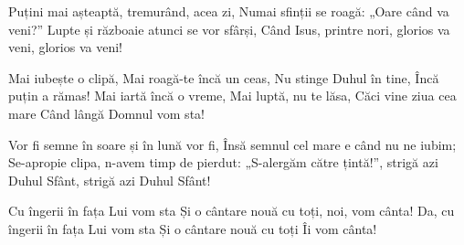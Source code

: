 \beginverse
Puțini mai așteaptă, tremurând, acea zi,
Numai sfinții se roagă: „Oare când va veni?”
Lupte și războaie atunci se vor sfârși,
Când Isus, printre nori, glorios va veni, glorios va veni!
\endverse

\beginchorus
Mai iubește o clipă,
Mai roagă-te încă un ceas,
Nu stinge Duhul în tine,
Încă puțin a rămas!
Mai iartă încă o vreme,
Mai luptă, nu te lăsa,
Căci vine ziua cea mare
Când lângă Domnul vom sta!
\endchorus

\beginverse
Vor fi semne în soare și în lună vor fi,
Însă semnul cel mare e când nu ne iubim;
Se-apropie clipa, n-avem timp de pierdut:
„S-alergăm către țintă!”, strigă azi Duhul Sfânt, strigă azi Duhul Sfânt!
\endverse

\beginverse*
Cu îngerii în fața Lui vom sta
Și o cântare nouă cu toți, noi, vom cânta!
Da, cu îngerii în fața Lui vom sta
Și o cântare nouă cu toți Îi vom cânta!
\endverse
\endsong